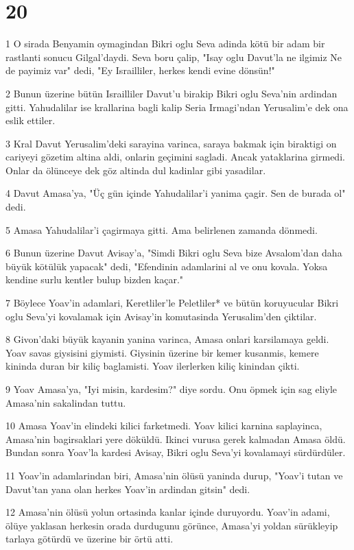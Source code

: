 \chapter{20}

\par 1 O sirada Benyamin oymagindan Bikri oglu Seva adinda kötü bir adam bir rastlanti sonucu Gilgal'daydi. Seva boru çalip, "Isay oglu Davut'la ne ilgimiz Ne de payimiz var" dedi, "Ey Israilliler, herkes kendi evine dönsün!"
\par 2 Bunun üzerine bütün Israilliler Davut'u birakip Bikri oglu Seva'nin ardindan gitti. Yahudalilar ise krallarina bagli kalip Seria Irmagi'ndan Yerusalim'e dek ona eslik ettiler.
\par 3 Kral Davut Yerusalim'deki sarayina varinca, saraya bakmak için biraktigi on cariyeyi gözetim altina aldi, onlarin geçimini sagladi. Ancak yataklarina girmedi. Onlar da ölünceye dek göz altinda dul kadinlar gibi yasadilar.
\par 4 Davut Amasa'ya, "Üç gün içinde Yahudalilar'i yanima çagir. Sen de burada ol" dedi.
\par 5 Amasa Yahudalilar'i çagirmaya gitti. Ama belirlenen zamanda dönmedi.
\par 6 Bunun üzerine Davut Avisay'a, "Simdi Bikri oglu Seva bize Avsalom'dan daha büyük kötülük yapacak" dedi, "Efendinin adamlarini al ve onu kovala. Yoksa kendine surlu kentler bulup bizden kaçar."
\par 7 Böylece Yoav'in adamlari, Keretliler'le Peletliler* ve bütün koruyucular Bikri oglu Seva'yi kovalamak için Avisay'in komutasinda Yerusalim'den çiktilar.
\par 8 Givon'daki büyük kayanin yanina varinca, Amasa onlari karsilamaya geldi. Yoav savas giysisini giymisti. Giysinin üzerine bir kemer kusanmis, kemere kininda duran bir kiliç baglamisti. Yoav ilerlerken kiliç kinindan çikti.
\par 9 Yoav Amasa'ya, "Iyi misin, kardesim?" diye sordu. Onu öpmek için sag eliyle Amasa'nin sakalindan tuttu.
\par 10 Amasa Yoav'in elindeki kilici farketmedi. Yoav kilici karnina saplayinca, Amasa'nin bagirsaklari yere döküldü. Ikinci vurusa gerek kalmadan Amasa öldü. Bundan sonra Yoav'la kardesi Avisay, Bikri oglu Seva'yi kovalamayi sürdürdüler.
\par 11 Yoav'in adamlarindan biri, Amasa'nin ölüsü yaninda durup, "Yoav'i tutan ve Davut'tan yana olan herkes Yoav'in ardindan gitsin" dedi.
\par 12 Amasa'nin ölüsü yolun ortasinda kanlar içinde duruyordu. Yoav'in adami, ölüye yaklasan herkesin orada durdugunu görünce, Amasa'yi yoldan sürükleyip tarlaya götürdü ve üzerine bir örtü atti.
